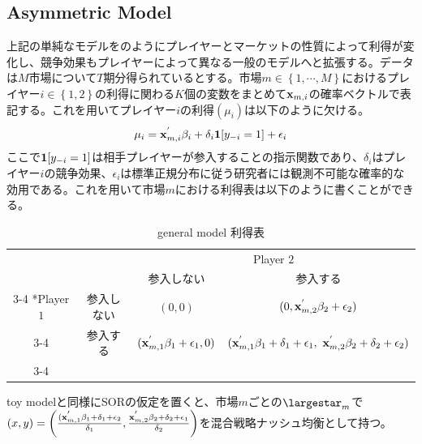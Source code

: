 \documentclass{jsarticle}
\begin{document}
\subsection{Asymmetric Model}
上記の単純なモデルを\cite{3}のようにプレイヤーとマーケットの性質によって利得が変化し、競争効果もプレイヤーによって異なる一般のモデルへと拡張する。データは$M$市場について$T$期分得られているとする。市場$m \in \left\{ 1, \cdots, M\right\}$におけるプレイヤー$i \in \left\{ 1,2\right\}$の利得に関わる$K$個の変数をまとめて${\bf x}_{m, i}$の確率ベクトルで表記する。これを用いてプレイヤー$i$の利得$(\mu_i)$は以下のように欠ける。
\begin{align*}
	\mu_i = {\bf x}_{m, i}^{'} \beta_i + \delta_i {\bf 1}[y_{-i} = 1]+ \epsilon_i
\end{align*}
ここで${\bf 1}[y_{-i} = 1]$は相手プレイヤーが参入することの指示関数であり、$\delta_i$はプレイヤー$i$の競争効果、$\epsilon_i$は標準正規分布に従う研究者には観測不可能な確率的な効用である。これを用いて市場$m$における利得表は以下のように書くことができる。
\begin{table}[h]
    \caption{general model 利得表}
    \centering
    \setlength{\extrarowheight}{2pt}
    \begin{tabular}{cc|c|c|}
      & \multicolumn{1}{c}{} & \multicolumn{2}{c}{Player $2$}\\
      & \multicolumn{1}{c}{} & \multicolumn{1}{c}{参入しない}  & \multicolumn{1}{c}{参入する} \\\cline{3-4}
      \multirow{2}*{Player $1$}  & 参入しない & $(0,0)$ & $(0,{\bf x}_{m, 2}^{'} \beta_2+\epsilon_2)$ \\\cline{3-4}
      & 参入する & $({\bf x}_{m, 1}^{'} \beta_1+\epsilon_1,0)$ & $({\bf x}_{m, 1}^{'} \beta_1+\delta_1+\epsilon_1,\ {\bf x}_{m, 2}^{'} \beta_2+\delta_2+\epsilon_2)$ \\\cline{3-4}
    \end{tabular}
\end{table}

toy modelと同様にSORの仮定を置くと、市場$m$ごとの$\largestar_m$で$(x, y) = \left( \frac{({\bf x}_{m, 1}^{'} \beta_1 + \delta_1 + \epsilon_2}{\delta_1} ,  \frac{{\bf x}_{m, 2}^{'} \beta_2 + \delta_2 + \epsilon_1}{\delta_2} \right)$を混合戦略ナッシュ均衡として持つ。
\end{document}
